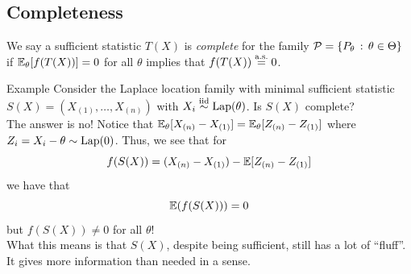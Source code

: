 \subsection*{Completeness}

\begin{definition}
    We say a sufficient statistic $T(X)$ is \emph{complete} for the family $\cal{P} = \{P_{\theta} \col \theta \in \Theta\}$ if $\E_{\theta}[f(T(X))] = 0$ for all $\theta$ implies that $f(T(X)) \overset{\tt{a.s.}}{=} 0$. 
\end{definition}

\begin{example}{Example}
    Consider the Laplace location family with minimal sufficient statistic $S(X) = (X_{(1)}, \ldots, X_{(n)})$ with $X_i \iidsim \tt{Lap}(\theta)$. Is $S(X)$ complete?\\

    The answer is no! Notice that $\bb{E}_{\theta}[X_{(n)} - X_{(1)}] = \bb{E}_{\theta}[Z_{(n)} - Z_{(1)}]$ where $Z_i = X_i - \theta \sim \tt{Lap}(0)$. Thus, we see that for 
    \[ f(S(X)) = (X_{(n)} - X_{(1)}) - \bb{E}[Z_{(n)} - Z_{(1)}] \]
    we have that
    \[ \bb{E}(f(S(X))) = 0 \]
    but $f(S(X)) \ne 0$ for all $\theta$!\\

    What this means is that $S(X)$, despite being sufficient, still has a lot of ``fluff''. It gives more information than needed in a sense. 
\end{example}